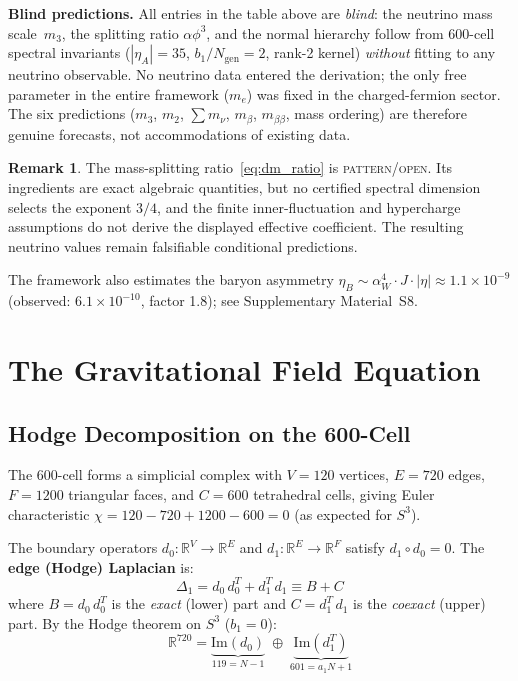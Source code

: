 \documentclass[12pt,a4paper]{article}
\theoremstyle{definition}
\newtheorem{remark}{Remark}
\begin{document}
\textbf{Blind predictions.}  All entries in the table above are \emph{blind}: the neutrino mass scale~$m_3$, the splitting ratio $\alpha\phi^3$, and the normal hierarchy follow from 600-cell spectral invariants ($|\eta_A| = 35$, $b_1/N_{\text{gen}} = 2$, rank-2 kernel) \emph{without} fitting to any neutrino observable.  No neutrino data entered the derivation; the only free parameter in the entire framework ($m_e$) was fixed in the charged-fermion sector.  The six predictions ($m_3$, $m_2$, $\sum m_\nu$, $m_\beta$, $m_{\beta\beta}$, mass ordering) are therefore genuine forecasts, not accommodations of existing data.

\begin{remark}
The mass-splitting ratio~\eqref{eq:dm_ratio} is \textsc{pattern/open}.  Its
ingredients are exact algebraic quantities, but no certified spectral
dimension selects the exponent $3/4$, and the finite inner-fluctuation and
hypercharge assumptions do not derive the displayed effective coefficient.
The resulting neutrino values remain falsifiable conditional predictions.
\end{remark}

The framework also estimates the baryon asymmetry $\eta_B \sim \alpha_W^4 \cdot J \cdot |\eta| \approx 1.1 \times 10^{-9}$ (observed: $6.1 \times 10^{-10}$, factor 1.8); see Supplementary Material~S8.




\section{The Gravitational Field Equation}
\label{sec:gravity}

\subsection{Hodge Decomposition on the 600-Cell}

The 600-cell forms a simplicial complex with $V = 120$ vertices, $E = 720$ edges, $F = 1200$ triangular faces, and $C = 600$ tetrahedral cells, giving Euler characteristic $\chi = 120 - 720 + 1200 - 600 = 0$ (as expected for $S^3$).

The boundary operators $d_0: \mathbb{R}^V \to \mathbb{R}^E$ and $d_1: \mathbb{R}^E \to \mathbb{R}^F$ satisfy $d_1 \circ d_0 = 0$. The \textbf{edge (Hodge) Laplacian} is:
\begin{equation}
\Delta_1 = d_0\,d_0^T + d_1^T\,d_1 \equiv B + C
\end{equation}
where $B = d_0\,d_0^T$ is the \emph{exact} (lower) part and $C = d_1^T\,d_1$ is the \emph{coexact} (upper) part. By the Hodge theorem on $S^3$ ($b_1 = 0$):
\begin{equation}
\mathbb{R}^{720} = \underbrace{\mathrm{Im}(d_0)}_{119 = N-1} \;\oplus\; \underbrace{\mathrm{Im}(d_1^T)}_{601 = a_1 N + 1}
\end{equation}
\end{document}
